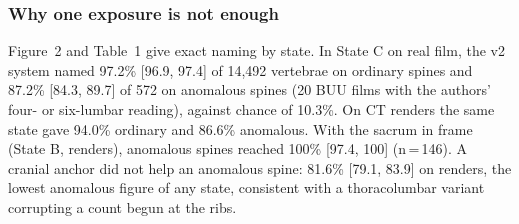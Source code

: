 \documentclass[11pt,letterpaper]{article}
\newcommand{\ci}[2]{[#1, #2]}
\begin{document}
\subsubsection*{Why one exposure is not enough}
Figure~2 and Table~1 give exact naming by state. In State C on real film, the v2 system named 97.2\% \ci{96.9}{97.4} of 14,492 vertebrae on ordinary spines and 87.2\% \ci{84.3}{89.7} of 572 on anomalous spines (20 BUU films with the authors' four- or six-lumbar reading), against chance of 10.3\%. On CT renders the same state gave 94.0\% ordinary and 86.6\% anomalous. With the sacrum in frame (State B, renders), anomalous spines reached 100\% \ci{97.4}{100} (n\,=\,146). A cranial anchor did not help an anomalous spine: 81.6\% \ci{79.1}{83.9} on renders, the lowest anomalous figure of any state, consistent with a thoracolumbar variant corrupting a count begun at the ribs.
\end{document}
